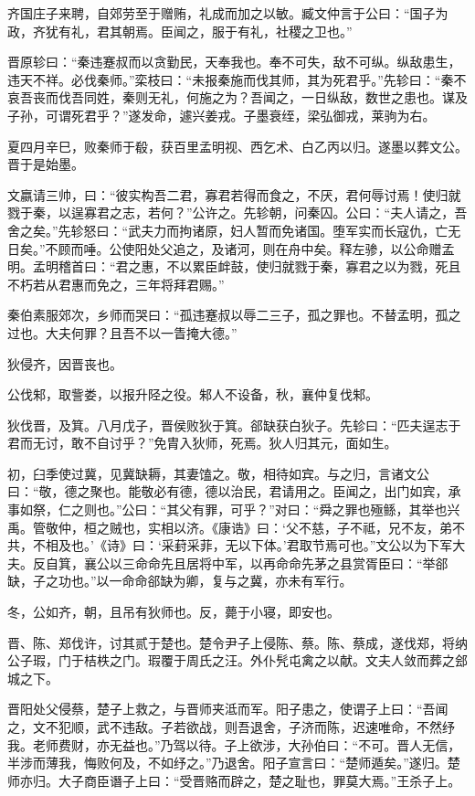 \documentclass[a4paper,12pt,UTF8,twoside]{ctexbook}
\begin{document}
齐国庄子来聘，自郊劳至于赠贿，礼成而加之以敏。臧文仲言于公曰：“国子为政，齐犹有礼，君其朝焉。臣闻之，服于有礼，社稷之卫也。”

晋原轸曰：“秦违蹇叔而以贪勤民，天奉我也。奉不可失，敌不可纵。纵敌患生，违天不祥。必伐秦师。”栾枝曰：“未报秦施而伐其师，其为死君乎。”先轸曰：“秦不哀吾丧而伐吾同姓，秦则无礼，何施之为？吾闻之，一日纵敌，数世之患也。谋及子孙，可谓死君乎？”遂发命，遽兴姜戎。子墨衰绖，梁弘御戎，莱驹为右。

夏四月辛巳，败秦师于殽，获百里孟明视、西乞术、白乙丙以归。遂墨以葬文公。晋于是始墨。

文嬴请三帅，曰：“彼实构吾二君，寡君若得而食之，不厌，君何辱讨焉！使归就戮于秦，以逞寡君之志，若何？”公许之。先轸朝，问秦囚。公曰：“夫人请之，吾舍之矣。”先轸怒曰：“武夫力而拘诸原，妇人暂而免诸国。堕军实而长寇仇，亡无日矣。”不顾而唾。公使阳处父追之，及诸河，则在舟中矣。释左骖，以公命赠孟明。孟明稽首曰：“君之惠，不以累臣衅鼓，使归就戮于秦，寡君之以为戮，死且不朽若从君惠而免之，三年将拜君赐。”

秦伯素服郊次，乡师而哭曰：“孤违蹇叔以辱二三子，孤之罪也。不替孟明，孤之过也。大夫何罪？且吾不以一眚掩大德。”

狄侵齐，因晋丧也。

公伐邾，取訾娄，以报升陉之役。邾人不设备，秋，襄仲复伐邾。

狄伐晋，及箕。八月戊子，晋侯败狄于箕。郤缺获白狄子。先轸曰：“匹夫逞志于君而无讨，敢不自讨乎？”免胄入狄师，死焉。狄人归其元，面如生。

初，臼季使过冀，见冀缺耨，其妻馌之。敬，相待如宾。与之归，言诸文公曰：“敬，德之聚也。能敬必有德，德以治民，君请用之。臣闻之，出门如宾，承事如祭，仁之则也。”公曰：“其父有罪，可乎？”对曰：“舜之罪也殛鲧，其举也兴禹。管敬仲，桓之贼也，实相以济。《康诰》曰：‘父不慈，子不祗，兄不友，弟不共，不相及也。’《诗》曰：‘采葑采菲，无以下体。’君取节焉可也。”文公以为下军大夫。反自箕，襄公以三命命先且居将中军，以再命命先茅之县赏胥臣曰：“举郤缺，子之功也。”以一命命郤缺为卿，复与之冀，亦未有军行。

冬，公如齐，朝，且吊有狄师也。反，薨于小寝，即安也。

晋、陈、郑伐许，讨其贰于楚也。楚令尹子上侵陈、蔡。陈、蔡成，遂伐郑，将纳公子瑕，门于桔柣之门。瑕覆于周氏之汪。外仆髠屯禽之以献。文夫人敛而葬之郐城之下。

晋阳处父侵蔡，楚子上救之，与晋师夹泜而军。阳子患之，使谓子上曰：“吾闻之，文不犯顺，武不违敌。子若欲战，则吾退舍，子济而陈，迟速唯命，不然纾我。老师费财，亦无益也。”乃驾以待。子上欲涉，大孙伯曰：“不可。晋人无信，半涉而薄我，悔败何及，不如纾之。”乃退舍。阳子宣言曰：“楚师遁矣。”遂归。楚师亦归。大子商臣谮子上曰：“受晋赂而辟之，楚之耻也，罪莫大焉。”王杀子上。
\end{document}

